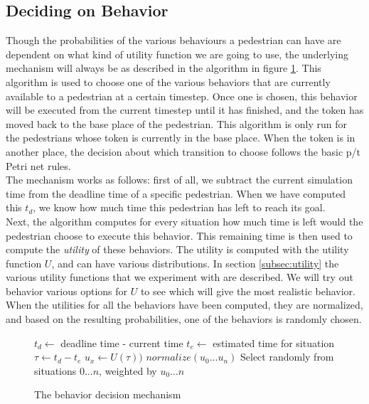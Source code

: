 \documentclass[11pt, a4paper]{book}
\begin{document}
\subsection{Deciding on Behavior}
Though the probabilities of the various behaviours a pedestrian can have are dependent on what kind of utility function we are going to use, the underlying mechanism will always be as described in the algorithm in figure \ref{fig:decisionmechanism}. This algorithm is used to choose one of the various behaviors that are currently available to a pedestrian at a certain timestep. Once one is chosen, this behavior will be executed from the current timestep until it has finished, and the token has moved back to the base place of the pedestrian. This algorithm is only run for the pedestrians whose token is currently in the base place. When the token is in another place, the decision about which transition to choose follows the basic p/t Petri net rules.\\
The mechanism works as follows: first of all, we subtract the current simulation time from the deadline time of a specific pedestrian.  When we have computed this $t_d$, we know how much time this pedestrian has left to reach its goal.\\
Next, the algorithm computes for every situation how much time is left would the pedestrian choose to execute this behavior. This remaining time is then used to compute the \emph{utility} of these behaviors. The utility is computed with the utility function $U$, and can have various distributions. In section \ref{subsec:utility} the various utility functions that we experiment with are described. We will try out behavior various options for $U$ to see which will give the most realistic behavior. When the utilities for all the behaviors have been computed, they are normalized, and based on the resulting probabilities, one of the behaviors is randomly chosen.

\begin{figure}
\begin{algorithm}

\begin{algorithmic}
\State $t_d \gets $ deadline time - current time 
\State $t_e \gets $ estimated time for situation
\State $\tau \gets t_d - t_e$
\State $u_x \gets U(\tau))$
\EndFor
\State $normalize(u_0 \ldots u_n)$
\State Select randomly from situations $0 \ldots n$, weighted by $u_0 \ldots n$
\end{algorithmic}
\end{algorithm}
\caption{The behavior decision mechanism}
\label{fig:decisionmechanism}
\end{figure}
\end{document}
